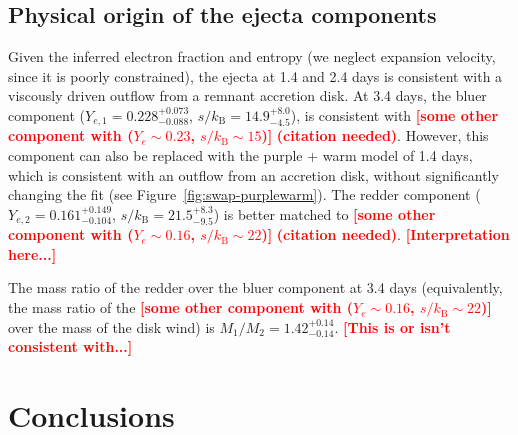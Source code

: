 \documentclass[twocolumn,twocolappendix]{aastex63}
\def\citneeded{\textcolor{red}{\textbf{(citation needed)}}}
\newcommand\redbf[1]{\textbf{\textcolor{red}{#1}}}
\begin{document}
\subsection{Physical origin of the ejecta components}\label{ssc:disco-origins}

 Given the inferred electron fraction and entropy (we neglect expansion velocity, since it is poorly constrained), the ejecta at 1.4 and 2.4 days is consistent with a viscously driven outflow from a remnant accretion disk. At 3.4 days, the bluer component ($Y_{e,1} = 0.228^{+0.073}_{-0.088}$, $s / k_{\mathrm{B}} = 14.9^{+8.0}_{-4.5}$), is consistent with \redbf{[some other component with ($Y_e \sim 0.23$, $s / k_{\mathrm{B}} \sim 15$)]} \citneeded . However, this component can also be replaced with the purple + warm model of 1.4 days, which is consistent with an outflow from an accretion disk, without significantly changing the fit (see Figure~\ref{fig:swap-purplewarm}). The redder component ($Y_{e,2} = 0.161^{+0.149}_{-0.104}$, $s / k_{\mathrm{B}} = 21.5^{+8.3}_{-9.5}$) is better matched to \redbf{[some other component with ($Y_e \sim 0.16$, $s / k_{\mathrm{B}} \sim 22$)]} \citneeded . \redbf{[Interpretation here...]}

 The mass ratio of the redder over the bluer component at 3.4 days (equivalently, the mass ratio of the \redbf{[some other component with ($Y_e \sim 0.16$, $s / k_{\mathrm{B}} \sim 22$)]} over the mass of the disk wind) is $M_1 / M_2 = 1.42^{+0.14}_{-0.14}$. \redbf{[This is or isn't consistent with...]}









\section{Conclusions}\label{sec:conco}
\end{document}
